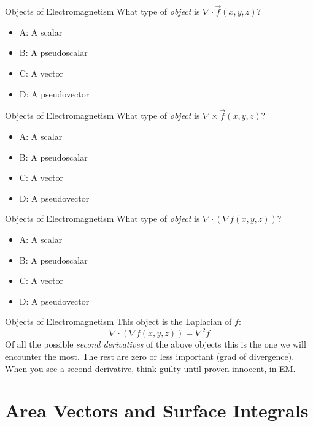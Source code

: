 \documentclass{beamer}
\begin{document}
\begin{frame}{Objects of Electromagnetism}
What type of \textit{object} is $\nabla \cdot \vec{f}(x,y,z)$?
\begin{itemize}
\item A: A scalar
\item B: A pseudoscalar
\item C: A vector
\item D: A pseudovector
\end{itemize}
\end{frame}

\begin{frame}{Objects of Electromagnetism}
What type of \textit{object} is $\nabla \times \vec{f}(x,y,z)$?
\begin{itemize}
\item A: A scalar
\item B: A pseudoscalar
\item C: A vector
\item D: A pseudovector
\end{itemize}
\end{frame}

\begin{frame}{Objects of Electromagnetism}
What type of \textit{object} is $\nabla \cdot (\nabla f(x,y,z))$?
\begin{itemize}
\item A: A scalar
\item B: A pseudoscalar
\item C: A vector
\item D: A pseudovector
\end{itemize}
\end{frame}

\begin{frame}{Objects of Electromagnetism}
This object is the Laplacian of $f$:
\begin{equation}
\nabla \cdot (\nabla f(x,y,z)) = \nabla^2 f
\end{equation}
Of all the possible \textit{second derivatives} of the above objects this is the one we will encounter the most.  The rest are zero or less important (grad of divergence).  When you see a second derivative, think guilty until proven innocent, in EM.
\end{frame}

\section{Area Vectors and Surface Integrals}
\end{document}
